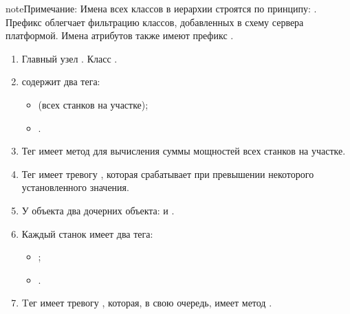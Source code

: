 \documentclass[a4paper,10pt,russian]{sphinxmanual}
\begin{document}
\begin{sphinxadmonition}{note}{Примечание:}
\sphinxAtStartPar
Имена всех классов в иерархии строятся по принципу: .
Префикс  облегчает фильтрацию классов, добавленных в схему сервера
платформой.
Имена атрибутов также имеют префикс .
\end{sphinxadmonition}
\begin{enumerate}
%
\item {}
\sphinxAtStartPar
Главный узел \sphinxhyphen{} . Класс \sphinxhyphen{} .

\item {}
\sphinxAtStartPar
{} содержит два тега:
\begin{itemize}
\item {}
\sphinxAtStartPar
{} (всех станков на участке);

\item {}
\sphinxAtStartPar
{}.

\end{itemize}

\item {}
\sphinxAtStartPar
Тег  имеет метод для
вычисления суммы мощностей всех станков на участке.

\item {}
\sphinxAtStartPar
Тег  имеет тревогу
, которая срабатывает при превышении некоторого
установленного значения.

\item {}
\sphinxAtStartPar
У объекта  \sphinxhyphen{} два дочерних объекта:  и .

\item {}
\sphinxAtStartPar
Каждый станок имеет два тега:
\begin{itemize}
\item {}
\sphinxAtStartPar
{};

\item {}
\sphinxAtStartPar
{}.

\end{itemize}

\item {}
\sphinxAtStartPar
Tег  имеет тревогу , которая, в свою очередь,
имеет метод .

\end{enumerate}
\end{document}
